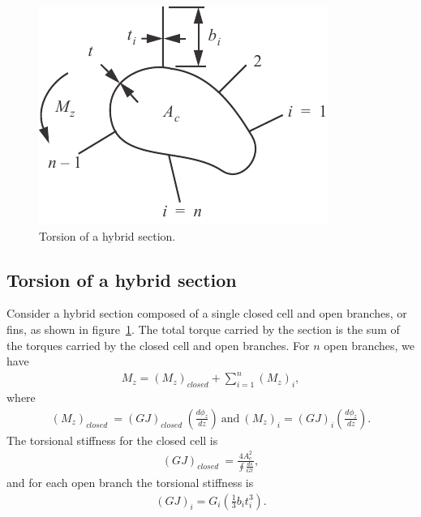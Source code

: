 \documentclass{AeroStructure-ERJohnson}
\begin{document}
\begin{figure}
\includegraphics{Figure_4-34.pdf}
\caption{Torsion of a hybrid section.\label{fig4.34}}
\end{figure}

\subsection{Torsion of a hybrid section}\label{sec4.4.2}

Consider a hybrid section composed of a single closed cell and open branches, or fins, as shown in figure~\ref{fig4.34}. The total torque carried by the section is the sum of the torques carried by the closed cell and open branches. For $n$ open branches, we have
\begin{align}\label{eq4.59}
M_{z}=\left(M_{z}\right)_{\textit{closed}}+\sum_{i=1}^{n}\left(M_{z}\right)_{i},
\end{align}
where
\begin{align}\label{eq4.60}
\left(M_{z}\right)_{\textit{closed }}=(G J)_{\textit{closed }}\left(\frac{d \phi_{z}}{d z}\right)\ \text{and}\ \left(M_{z}\right)_{i}=(G J)_{i}\left(\frac{d \phi_{z}}{d z}\right).
\end{align}
\noindent The torsional stiffness for the closed cell is
\begin{align}\label{eq4.61}
(G J)_{\textit{closed }}=\frac{4 A_{c}^{2}}{\oint\! \frac{d s}{G t}},
\end{align}
and for each open branch the torsional stiffness is
\begin{align}\label{eq4.62}
(G J)_{i}=G_{i}\left(\frac{1}{3} b_{i} t_{i}^{3}\right).
\end{align}
\vspace*{-\baselineskip}
\end{document}
